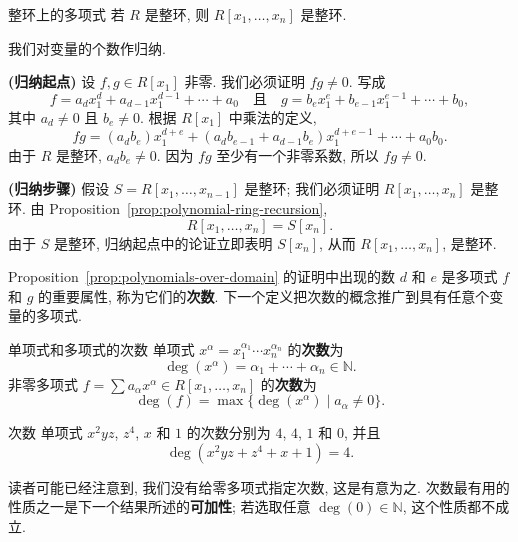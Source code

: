 \begin{Proposition}{整环上的多项式}\label{prop:polynomials-over-domain}
  若 $R$ 是整环, 则 $R[x_{1},\ldots,x_{n}]$ 是整环.
\end{Proposition}

\begin{Proof}
  我们对变量的个数作归纳.

  \textbf{(归纳起点)} 设 $f,g\in R[x_{1}]$ 非零. 我们必须证明 $fg\ne0$. 写成
  \[
    f=a_{d}x_{1}^{d}+a_{d-1}x_{1}^{d-1}+\cdots+a_{0}
    \quad\text{且}\quad
    g=b_{e}x_{1}^{e}+b_{e-1}x_{1}^{e-1}+\cdots+b_{0},
  \]
  其中 $a_{d}\ne0$ 且 $b_{e}\ne0$. 根据 $R[x_{1}]$ 中乘法的定义,
  \[
    fg=(a_{d}b_{e})x_{1}^{d+e}
    +(a_{d}b_{e-1}+a_{d-1}b_{e})x_{1}^{d+e-1}+\cdots+a_{0}b_{0}.
  \]
  由于 $R$ 是整环, $a_{d}b_{e}\ne0$. 因为 $fg$ 至少有一个非零系数, 所以 $fg\ne0$.

  \textbf{(归纳步骤)} 假设 $S=R[x_{1},\ldots,x_{n-1}]$ 是整环; 我们必须证明 $R[x_{1},\ldots,x_{n}]$ 是整环. 由 Proposition~\ref{prop:polynomial-ring-recursion},
  \[
    R[x_{1},\ldots,x_{n}]=S[x_{n}].
  \]
  由于 $S$ 是整环, 归纳起点中的论证立即表明 $S[x_{n}]$, 从而 $R[x_{1},\ldots,x_{n}]$, 是整环.
\end{Proof}

Proposition~\ref{prop:polynomials-over-domain} 的证明中出现的数 $d$ 和 $e$ 是多项式 $f$ 和 $g$ 的重要属性, 称为它们的\textbf{次数}. 下一个定义把次数的概念推广到具有任意个变量的多项式.

\begin{Definition}{单项式和多项式的次数}\label{def:polynomial-degree}
  单项式 $x^{\alpha}=x_{1}^{\alpha_{1}}\cdots x_{n}^{\alpha_{n}}$ 的\textbf{次数}为
  \[
    \deg(x^{\alpha})=\alpha_{1}+\cdots+\alpha_{n}\in\mathbb{N}.
  \]
  非零多项式 $f=\sum a_{\alpha}x^{\alpha}\in R[x_{1},\ldots,x_{n}]$ 的\textbf{次数}为
  \[
    \deg(f)=\max\{\deg(x^{\alpha})\mid a_{\alpha}\ne0\}.
  \]
\end{Definition}

\begin{Example}{次数}\label{ex:monomial-and-polynomial-degrees}
  单项式 $x^{2}yz$, $z^{4}$, $x$ 和 $1$ 的次数分别为 $4$, $4$, $1$ 和 $0$, 并且
  \[
    \deg(x^{2}yz+z^{4}+x+1)=4.
  \]
\end{Example}

读者可能已经注意到, 我们没有给零多项式指定次数, 这是有意为之. 次数最有用的性质之一是下一个结果所述的\textbf{可加性}; 若选取任意 $\deg(0)\in\mathbb{N}$, 这个性质都不成立.
